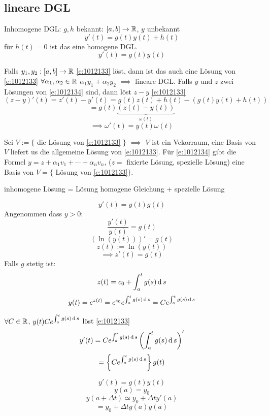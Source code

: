 \subsection{lineare DGL}
\begin{Def}
  Inhomogene DGL: $g,h$ bekannt: $[a,b]\to\mathbb{R}$, $y$ unbekannt
  \begin{equation}
    \label{e:1012134}
    y'(t)=g(t)y(t)+h(t)
  \end{equation}
  für $h(t)=0$ ist das eine homogene DGL.
  \begin{equation}
    \label{e:1012133}
    y'(t)=g(t)y(t)
  \end{equation}
\end{Def}
\begin{Bem}
  Falls $y_1,y_2:[a,b]\to\mathbb{R}$ \ref{e:1012133} löst, dann ist das auch eine Lösung von \ref{e:1012133} $\forall \alpha_1,\alpha_2\in\mathbb{R}$ $\alpha_1y_1+\alpha_2y_2$ $\implies$ lineare DGL. Falls $y$ und $z$ zwei Lösungen von \ref{e:1012134} sind, dann löst $z-y$ \ref{e:1012133}
  \[(z-y)'(t)=z'(t)-y'(t)=g(t)z(t)+h(t)-\left( g(t)y(t)+h(t) \right)\]
  \[=g(t)\underbrace{\left( z(t)-y(t) \right)}_{\omega(t)}\]
  \[\implies \omega'(t)=y(t)\omega(t)\]
\end{Bem}
\begin{Sat} %
  Sei $V:=\{$ die Lösung von \ref{e:1012133} $\}$ $\implies$ $V$ ist ein Vekorraum, eine Basis von $V$ liefert us die allgemeine Lösung von \ref{e:1012133}. Für \ref{e:1012134} gibt die Formel $y=z+\alpha_1v_1+\cdots+\alpha_nv_n$, ($z=$ fixierte Lösung, spezielle Lösung) eine Basis von $V=\{$ Lösung von \ref{e:1012133}$\}$.
\end{Sat}
\begin{Bem}
  inhomogene Lösung = Lösung homogene Gleichung + spezielle Lösung
\end{Bem}
\[y'(t)=y(t)g(t)\]
Angenommen dass $y>0$:
\[\frac{y'(t)}{y(t)}=g(t)\]
\[\left( \ln(y(t)) \right)'=g(t)\]
\[z(t):=\ln(y(t))\]
\[\implies z'(t)=g(t)\]
Falls $g$ stetig ist:
\[z(t)=c_0+\int_a^tg(s)\operatorname{d} s\]
\[y(t)=e^{z(t)}=e^{c_0}e^{\int_a^tg(s)\operatorname{d} s}=Ce^{\int_a^tg(s)\operatorname{d} s}\]
\begin{Bem}
  $\forall C\in\mathbb{R}$, $y(t)Ce^{\int_a^tg(s)\operatorname{d} s}$ löst \ref{e:1012133}
  \[y'(t)=Ce^{\int_a^tg(s)\operatorname{d} s}\left( \int_a^tg(s)\operatorname{d} s \right)'\]
  \[=\left\{ Ce^{\int_a^tg(s)\operatorname{d} s} \right\}g(t)\]
\end{Bem}
\begin{Bem}
  \[y'(t)=g(t)y(t)\]
  \[y(a)=y_0\]
  \[y(a+\Delta t)\simeq y_0+\Delta ty'(a)\]
  \[=y_0+\Delta tg(a)y(a)\]
\end{Bem}
